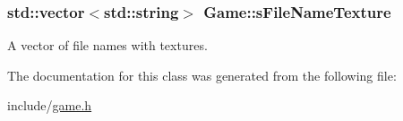 \subsubsection[{\texorpdfstring{s\+File\+Name\+Texture}{sFileNameTexture}}]{\setlength{\rightskip}{0pt plus 5cm}std\+::vector$<$std\+::string$>$ Game\+::s\+File\+Name\+Texture\hspace{0.3cm}{\ttfamily [private]}}\hypertarget{class_game_afd0a84adb730239bae2eed9a8eded08e}{}\label{class_game_afd0a84adb730239bae2eed9a8eded08e}
A vector of file names with textures. 

The documentation for this class was generated from the following file\+:\begin{DoxyCompactItemize}
\item 
include/\hyperlink{game_8h}{game.\+h}\end{DoxyCompactItemize}

